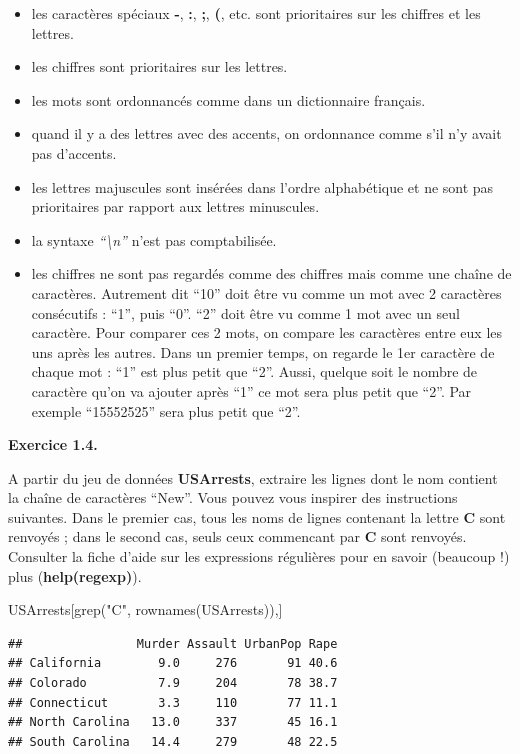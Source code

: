 \documentclass[
]{book}
\newenvironment{Shaded}{\begin{snugshade}}{\end{snugshade}}
\newcommand{\FunctionTok}[1]{\textcolor[rgb]{0.00,0.00,0.00}{#1}}
\newcommand{\NormalTok}[1]{#1}
\newcommand{\StringTok}[1]{\textcolor[rgb]{0.31,0.60,0.02}{#1}}
\theoremstyle{definition}
\theoremstyle{definition}
\theoremstyle{definition}
\theoremstyle{definition}
\theoremstyle{remark}
\begin{document}
\begin{itemize}
\item
  les caractères spéciaux \textbf{-}, \textbf{:}, \textbf{;}, \textbf{(}, etc. sont prioritaires sur les chiffres et les lettres.
\item
  les chiffres sont prioritaires sur les lettres.
\item
  les mots sont ordonnancés comme dans un dictionnaire français.
\item
  quand il y a des lettres avec des accents, on ordonnance comme s'il n'y avait pas d'accents.
\item
  les lettres majuscules sont insérées dans l'ordre alphabétique et ne sont pas prioritaires par rapport aux lettres minuscules.
\item
  la syntaxe \emph{``\textbackslash n''} n'est pas comptabilisée.
\item
  les chiffres ne sont pas regardés comme des chiffres mais comme une chaîne de caractères. Autrement dit ``10'' doit être vu comme un mot avec 2 caractères consécutifs : ``1'', puis ``0''. ``2'' doit être vu comme 1 mot avec un seul caractère. Pour comparer ces 2 mots, on compare les caractères entre eux les uns après les autres. Dans un premier temps, on regarde le 1er caractère de chaque mot : ``1'' est plus petit que ``2''. Aussi, quelque soit le nombre de caractère qu'on va ajouter après ``1'' ce mot sera plus petit que ``2''. Par exemple ``15552525'' sera plus petit que ``2''.
\end{itemize}

\textbf{Exercice 1.4.}

A partir du jeu de données \textbf{USArrests}, extraire les lignes dont le nom contient la chaîne de caractères ``New''. Vous pouvez vous inspirer des instructions suivantes. Dans le premier cas, tous les noms de lignes contenant la lettre \textbf{C} sont renvoyés ; dans le second cas, seuls ceux commencant par \textbf{C} sont renvoyés. Consulter la fiche d'aide sur les expressions régulières pour en savoir (beaucoup !) plus (\textbf{help(regexp)}).

\begin{Shaded}
\begin{Highlighting}[]
\NormalTok{USArrests[}\FunctionTok{grep}\NormalTok{(}\StringTok{"C"}\NormalTok{, }\FunctionTok{rownames}\NormalTok{(USArrests)),]}
\end{Highlighting}
\end{Shaded}

\begin{verbatim}
##                Murder Assault UrbanPop Rape
## California        9.0     276       91 40.6
## Colorado          7.9     204       78 38.7
## Connecticut       3.3     110       77 11.1
## North Carolina   13.0     337       45 16.1
## South Carolina   14.4     279       48 22.5
\end{verbatim}
\end{document}
